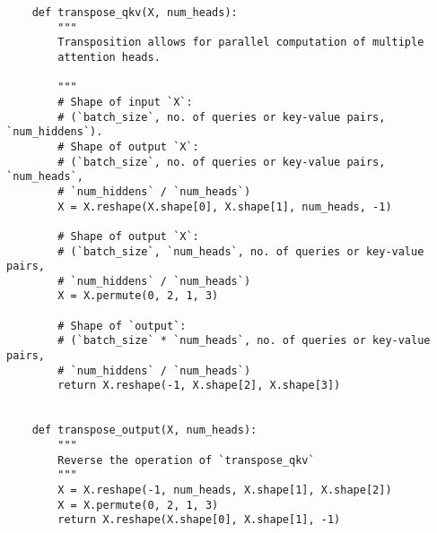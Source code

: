 \documentclass{article}
\begin{document}
\begin{lstlisting}
    def transpose_qkv(X, num_heads):
        """
        Transposition allows for parallel computation of multiple
        attention heads.

        """
        # Shape of input `X`:
        # (`batch_size`, no. of queries or key-value pairs, `num_hiddens`).
        # Shape of output `X`:
        # (`batch_size`, no. of queries or key-value pairs, `num_heads`,
        # `num_hiddens` / `num_heads`)
        X = X.reshape(X.shape[0], X.shape[1], num_heads, -1)

        # Shape of output `X`:
        # (`batch_size`, `num_heads`, no. of queries or key-value pairs,
        # `num_hiddens` / `num_heads`)
        X = X.permute(0, 2, 1, 3)

        # Shape of `output`:
        # (`batch_size` * `num_heads`, no. of queries or key-value pairs,
        # `num_hiddens` / `num_heads`)
        return X.reshape(-1, X.shape[2], X.shape[3])


    def transpose_output(X, num_heads):
        """
        Reverse the operation of `transpose_qkv`
        """
        X = X.reshape(-1, num_heads, X.shape[1], X.shape[2])
        X = X.permute(0, 2, 1, 3)
        return X.reshape(X.shape[0], X.shape[1], -1)



\end{lstlisting}
\clearpage
\end{document}
